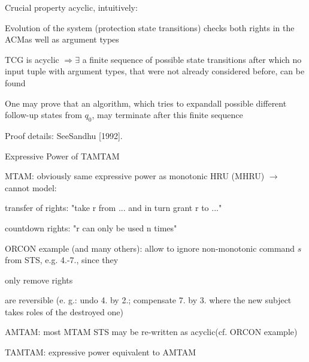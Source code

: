 \documentclass[a4paper]{article}
\begin{document}
\begin{multicols}{3}
    \begin{itemize*}
        \item Crucial property acyclic, intuitively:
              \begin{itemize*}
                  \item Evolution of the system (protection state transitions) checks both rights in the ACMas well as argument types
                  \item TCG is acyclic $\Rightarrow\exists$ a finite sequence of possible state transitions after which no input tuple with argument types, that were not already considered before, can be found
                  \item One may prove that an algorithm, which tries to expandall possible different follow-up states from $q_0$, may terminate after this finite sequence
                  \item Proof details: SeeSandhu [1992].
              \end{itemize*}
    \end{itemize*}

    Expressive Power of TAMTAM
    \begin{itemize*}
        \item MTAM: obviously same expressive power as monotonic HRU (MHRU) $\rightarrow$  cannot model:
              \begin{itemize*}
                  \item transfer of rights: "take r from ... and in turn grant r to ..."
                  \item countdown rights: "r can only be used n times"
              \end{itemize*}
        \item ORCON example (and many others): allow to ignore non-monotonic command $s$ from STS, e.g. 4.-7., since they
              \begin{itemize*}
                  \item only remove rights
                  \item are reversible (e. g.: undo 4. by 2.; compensate 7. by 3. where the new subject takes roles of the destroyed one)
              \end{itemize*}
        \item AMTAM: most MTAM STS may be re-written as acyclic(cf. ORCON example)
        \item TAMTAM: expressive power equivalent to AMTAM
    \end{itemize*}


\end{multicols}
\end{document}
